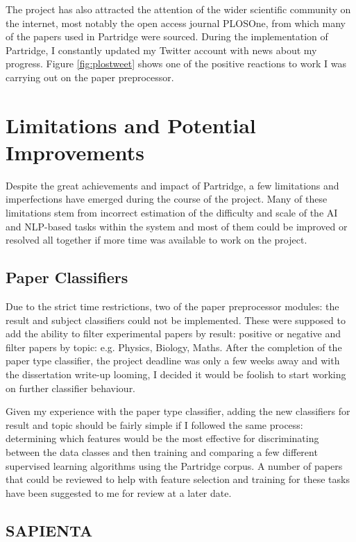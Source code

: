 The project has also attracted the attention of the wider scientific community
on the internet, most notably the open access journal PLOSOne, from which many
of the papers used in Partridge were sourced. During the implementation of
Partridge, I constantly updated my Twitter account with news about my
progress. Figure \ref{fig:plostweet} shows one of the positive reactions to
work I was carrying out on the paper preprocessor.


\section{ Limitations and Potential Improvements }

Despite the great achievements and impact of Partridge, a few limitations and
imperfections have emerged during the course of the project. Many of these
limitations stem from incorrect estimation of the difficulty and scale
of the AI and NLP-based tasks within the system and most of them could be
improved or resolved all together if more time was available to work on the
project.

\subsection{ Paper Classifiers}

Due to the strict time restrictions, two of the paper preprocessor modules: the
result and subject classifiers could not be implemented. These were supposed to
add the ability to filter experimental papers by result: positive or negative
and filter papers by topic: e.g. Physics, Biology, Maths. After the completion
of the paper type classifier, the project deadline was only a few weeks away
and with the dissertation write-up looming, I decided it would be foolish to
start working on further classifier behaviour.

Given my experience with the paper type classifier, adding the new classifiers
for result and topic should be fairly simple if I followed the same process:
determining which features would be the most effective for discriminating
between the data classes and then training and comparing a few different
supervised learning algorithms using the Partridge corpus. A number of papers
that could be reviewed to help with feature selection and training for these
tasks have been suggested to me for review at a later date.

\subsection{ SAPIENTA }

